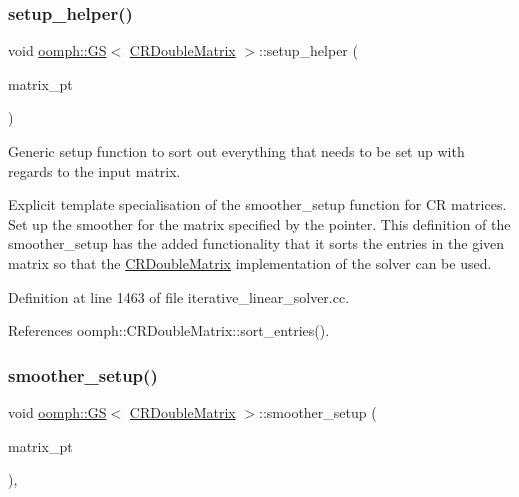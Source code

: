 \mbox{\label{classoomph_1_1GS_3_01CRDoubleMatrix_01_4_af18cc36ee80ca8a7323a89f2f1041a9c}} 
\subsubsection{\texorpdfstring{setup\+\_\+helper()}{setup\_helper()}}
{\footnotesize\ttfamily void \hyperlink{classoomph_1_1GS}{oomph\+::\+GS}$<$ \hyperlink{classoomph_1_1CRDoubleMatrix}{C\+R\+Double\+Matrix} $>$\+::setup\+\_\+helper (\begin{DoxyParamCaption}\item[{\hyperlink{classoomph_1_1DoubleMatrixBase}{Double\+Matrix\+Base} $\ast$}]{matrix\+\_\+pt }\end{DoxyParamCaption})}



Generic setup function to sort out everything that needs to be set up with regards to the input matrix. 

Explicit template specialisation of the smoother\+\_\+setup function for CR matrices. Set up the smoother for the matrix specified by the pointer. This definition of the smoother\+\_\+setup has the added functionality that it sorts the entries in the given matrix so that the \hyperlink{classoomph_1_1CRDoubleMatrix}{C\+R\+Double\+Matrix} implementation of the solver can be used. 

Definition at line 1463 of file iterative\+\_\+linear\+\_\+solver.\+cc.



References oomph\+::\+C\+R\+Double\+Matrix\+::sort\+\_\+entries().

\mbox{\label{classoomph_1_1GS_3_01CRDoubleMatrix_01_4_ab7762326bb595dc015a7504e1b9b996f}} 
\subsubsection{\texorpdfstring{smoother\+\_\+setup()}{smoother\_setup()}}
{\footnotesize\ttfamily void \hyperlink{classoomph_1_1GS}{oomph\+::\+GS}$<$ \hyperlink{classoomph_1_1CRDoubleMatrix}{C\+R\+Double\+Matrix} $>$\+::smoother\+\_\+setup (\begin{DoxyParamCaption}\item[{\hyperlink{classoomph_1_1DoubleMatrixBase}{Double\+Matrix\+Base} $\ast$}]{matrix\+\_\+pt }\end{DoxyParamCaption})\hspace{0.3cm}{\ttfamily [inline]}, {\ttfamily [virtual]}}



